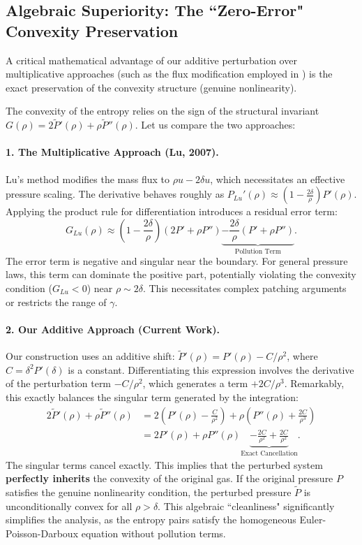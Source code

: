 \documentclass[12pt, reqno]{article}
\theoremstyle{definition}
\numberwithin{equation}{section}
\begin{document}
\subsection{Algebraic Superiority: The ``Zero-Error" Convexity Preservation}

A critical mathematical advantage of our additive perturbation over multiplicative approaches (such as the flux modification employed in \cite{Lu2007}) is the exact preservation of the convexity structure (genuine nonlinearity).

The convexity of the entropy relies on the sign of the structural invariant $G(\rho) = 2\tilde{P}'(\rho) + \rho \tilde{P}''(\rho)$. Let us compare the two approaches:

\paragraph{1. The Multiplicative Approach (Lu, 2007).}
Lu's method modifies the mass flux to $\rho u - 2\delta u$, which necessitates an effective pressure scaling. The derivative behaves roughly as $P_{Lu}'(\rho) \approx (1 - \frac{2\delta}{\rho}) P'(\rho)$. Applying the product rule for differentiation introduces a residual error term:
\[
G_{Lu}(\rho) \approx \left(1 - \frac{2\delta}{\rho}\right)(2P' + \rho P'') \underbrace{- \frac{2\delta}{\rho}(P' + \rho P'')}_{\text{Pollution Term}}.
\]
The error term is negative and singular near the boundary. For general pressure laws, this term can dominate the positive part, potentially violating the convexity condition ($G_{Lu} < 0$) near $\rho \sim 2\delta$. This necessitates complex patching arguments or restricts the range of $\gamma$.

\paragraph{2. Our Additive Approach (Current Work).}
Our construction uses an additive shift: $\tilde{P}'(\rho) = P'(\rho) - C/\rho^2$, where $C = \delta^2 P'(\delta)$ is a constant.
Differentiating this expression involves the derivative of the perturbation term $-C/\rho^2$, which generates a term $+2C/\rho^3$. Remarkably, this exactly balances the singular term generated by the integration:
\begin{align}
    2\tilde{P}'(\rho) + \rho \tilde{P}''(\rho) &= 2\left(P'(\rho) - \frac{C}{\rho^2}\right) + \rho \left(P''(\rho) + \frac{2C}{\rho^3}\right) \nonumber \\
    &= 2P'(\rho) + \rho P''(\rho) \underbrace{- \frac{2C}{\rho^2} + \frac{2C}{\rho^2}}_{\text{Exact Cancellation}}.
\end{align}
The singular terms cancel exactly. This implies that the perturbed system \textbf{perfectly inherits} the convexity of the original gas. If the original pressure $P$ satisfies the genuine nonlinearity condition, the perturbed pressure $\tilde{P}$ is unconditionally convex for all $\rho > \delta$. This algebraic ``cleanliness" significantly simplifies the analysis, as the entropy pairs satisfy the homogeneous Euler-Poisson-Darboux equation without pollution terms.
\end{document}
